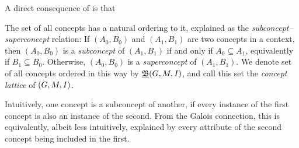 A direct consequence of  is that

The set of all concepts has a natural ordering to it, explained as the \textit{subconcept--superconcept} relation: If $(A_0, B_0)$ and $(A_1, B_1)$ are two concepts in a context, then $(A_0, B_0)$ is a \textit{subconcept} of $(A_1, B_1)$ if and only if $A_0 \subseteq A_1$, equivalently if $B_1 \subseteq B_0$. Otherwise, $(A_0, B_0)$ is a \textit{superconcept} of $(A_1, B_1)$. We denote set of all concepts ordered in this way by $\underline{{\mathfrak B}} (G,M,\mathrel{I})$, and call this set the \textit{concept lattice} of $(G,M,\mathrel{I})$.

Intuitively, one concept is a subconcept of another, if every instance of the first concept is also an instance of the second. From the Galois connection, this is equivalently, albeit less intuitively, explained by every attribute of the second concept being included in the first.

